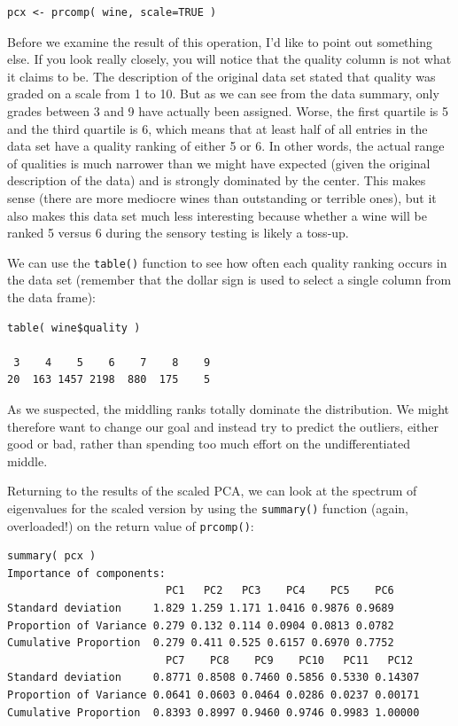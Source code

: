 \begin{verbatim}
pcx <- prcomp( wine, scale=TRUE )
\end{verbatim}

Before we examine the result of this operation, I'd like to point out
something else.  If you look really closely, you will notice that the
quality column is not what it claims to be. The description of the
original data set stated that quality was graded on a scale from 1 to
10.  But as we can see from the data summary, only grades between 3
and 9 have actually been assigned.  Worse, the first
quartile\vadjust{\pagebreak} is 5 and the third quartile is 6, which
means that at least half of all entries in the data set have a quality
ranking of either 5 or 6.  In other words, the actual range of qualities
is much narrower than we might have expected (given the original
description of the data) and is strongly dominated by the center.  This
makes sense (there are more mediocre wines than outstanding or terrible
ones), but it also makes this data set much less interesting because
whether a wine will be ranked 5 versus 6 during the sensory testing is
likely a toss-up.

We can use the \texttt{table()} function to see how often each quality
ranking occurs in the data set (remember that the dollar sign is used
to select a single column from the data frame):

\begin{verbatim}
table( wine$quality )

 3    4    5    6    7    8    9 
20  163 1457 2198  880  175    5 
\end{verbatim}\vspace*{-4pt}

As we suspected, the middling ranks totally dominate the distribution.
We might therefore want to change our goal and instead try to predict
the outliers, either good or bad, rather than spending too much effort
on the undifferentiated middle.

Returning to the results of the scaled PCA, we can look at the
spectrum of eigenvalues for the scaled version by using the
\texttt{summary()} function (again, overloaded!) on the return value
of \texttt{prcomp()}:

\begin{verbatim}
summary( pcx )
Importance of components:
                         PC1   PC2   PC3    PC4    PC5    PC6 
Standard deviation     1.829 1.259 1.171 1.0416 0.9876 0.9689 
Proportion of Variance 0.279 0.132 0.114 0.0904 0.0813 0.0782 
Cumulative Proportion  0.279 0.411 0.525 0.6157 0.6970 0.7752 
                         PC7    PC8    PC9    PC10   PC11   PC12
Standard deviation     0.8771 0.8508 0.7460 0.5856 0.5330 0.14307
Proportion of Variance 0.0641 0.0603 0.0464 0.0286 0.0237 0.00171
Cumulative Proportion  0.8393 0.8997 0.9460 0.9746 0.9983 1.00000
\end{verbatim}\vspace*{-4pt}

